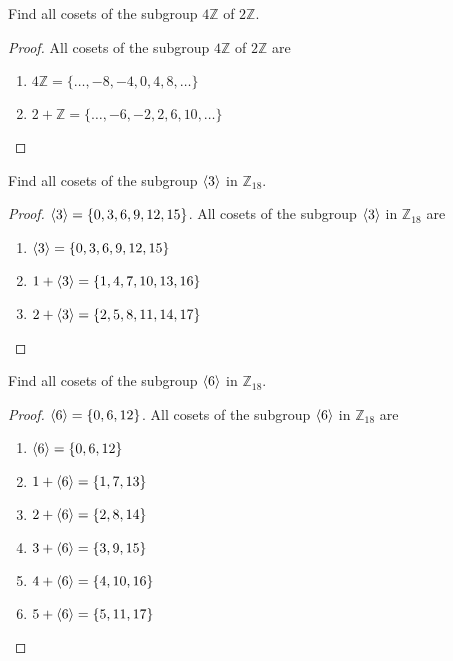 \begin{exercise}
    Find all cosets of the subgroup $4\mathbb{Z}$ of $2\mathbb{Z}$.
\end{exercise}

\begin{proof}
    All cosets of the subgroup $4\mathbb{Z}$ of $2\mathbb{Z}$ are
    \begin{enumerate}[label={(\arabic*)}]
        \item $4\mathbb{Z} = \{ \ldots, -8, -4, 0, 4, 8, \ldots \}$
        \item $2 + \mathbb{Z} = \{ \ldots, -6, -2, 2, 6, 10, \ldots \}$
    \end{enumerate}
\end{proof}

\begin{exercise}
    Find all cosets of the subgroup $\left\langle{3}\right\rangle$ in $\mathbb{Z}_{18}$.
\end{exercise}

\begin{proof}
    $\left\langle{3}\right\rangle = \{ 0, 3, 6, 9, 12, 15 \}$. All cosets of the subgroup $\left\langle{3}\right\rangle$ in $\mathbb{Z}_{18}$ are
    \begin{enumerate}[label={(\arabic*)}]
        \item $\left\langle{3}\right\rangle = \{ 0, 3, 6, 9, 12, 15 \}$
        \item $1 + \left\langle{3}\right\rangle = \{ 1, 4, 7, 10, 13, 16 \}$
        \item $2 + \left\langle{3}\right\rangle = \{ 2, 5, 8, 11, 14, 17 \}$
    \end{enumerate}
\end{proof}

\begin{exercise}
    Find all cosets of the subgroup $\left\langle{6}\right\rangle$ in $\mathbb{Z}_{18}$.
\end{exercise}

\begin{proof}
    $\left\langle{6}\right\rangle = \{ 0, 6, 12 \}$. All cosets of the subgroup $\left\langle{6}\right\rangle$ in $\mathbb{Z}_{18}$ are
    \begin{enumerate}[label={(\arabic*)}]
        \item $\left\langle{6}\right\rangle = \{ 0, 6, 12 \}$
        \item $1 + \left\langle{6}\right\rangle = \{ 1, 7, 13 \}$
        \item $2 + \left\langle{6}\right\rangle = \{ 2, 8, 14 \}$
        \item $3 + \left\langle{6}\right\rangle = \{ 3, 9, 15 \}$
        \item $4 + \left\langle{6}\right\rangle = \{ 4, 10, 16 \}$
        \item $5 + \left\langle{6}\right\rangle = \{ 5, 11, 17 \}$
    \end{enumerate}
\end{proof}

